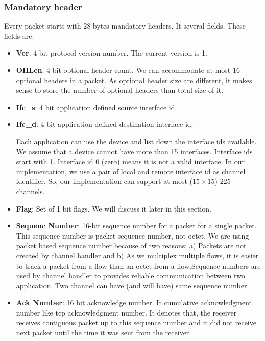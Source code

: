 \subsubsection{Mandatory header}
Every packet starts with 28 bytes mandatory headers. It several fields. These fields are:
\begin{itemize}
    \item \textbf{Ver}: 4 bit protocol version number. The current version is 1.
    
    \item \textbf{OHLen}: 4 bit optional header count. We can accommodate at most 16 optional headers in a packet. As optional header size are different, it makes sense to store the number of optional headers than total size of it.
    
    \item \textbf{Ifc\_s}: 4 bit application defined source interface id.
    \item \textbf{Ifc\_d}: 4 bit application defined destination interface id.
    
    \hspace{3pt} Each application can use the device and list down the interface ids available. We assume that a device cannot have more than 15 interfaces. Interface ids start with 1. Interface id $0$ (zero) means it is not a valid interface. In our implementation, we use a pair of local and remote interface id as channel identifier. So, our implementation can support at most ($15\times15$) $225$ channels.
    
    \item \textbf{Flag}: Set of 1 bit flags. We will discuss it later in this section.
    
    \item \textbf{Sequenc Number}: 16-bit sequence number for a packet for a single packet. This sequence number is packet sequence number, not octet. We are using packet based sequence number because of two reasons: a) Packets are not created by channel handler and b) As we multiplex multiple flows, it is easier to track a packet from a flow than an octet from a flow.Sequence numbers are used by channel handler to provides reliable communication between two application. Two channel can have (and will have) same sequence number.
    
    \item \textbf{Ack Number}: 16 bit acknowledge number. It cumulative acknowledgment number like \acrshort{tcp} acknowledgment number. It denotes that, the receiver receives contiguous packet up to this sequence number and it did not receive next packet until the time it was sent from the receiver.
    

\end{itemize}
